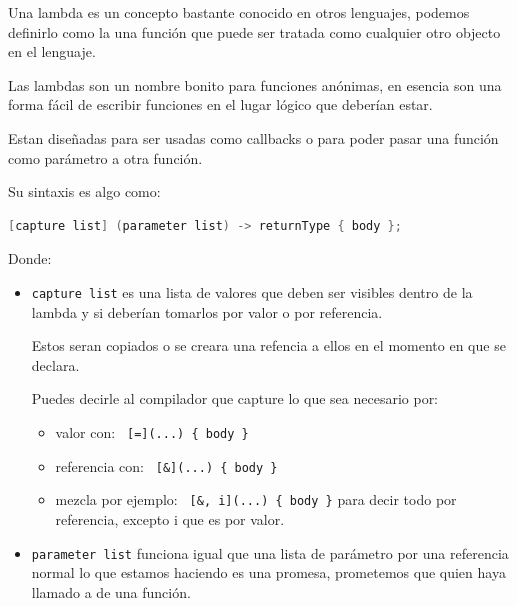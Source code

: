 \documentclass[12pt, fleqn]{report}                             %
\theoremstyle{break}                                            %
\newcommand{\textCode}[1]  { \texttt{#1} }                      %
\begin{document}
                Una lambda es un concepto bastante conocido en otros lenguajes, podemos definirlo como 
                la una función que puede ser tratada como cualquier otro objecto en el lenguaje.

                Las lambdas son un nombre bonito para funciones anónimas, en esencia son una forma fácil
                de escribir funciones en el lugar lógico que deberían estar.

                Estan diseñadas para ser usadas como callbacks o para poder pasar una función como parámetro
                a otra función.

                Su sintaxis es algo como:
                \begin{lstlisting}[language=C++, gobble=20]
                    [capture list] (parameter list) -> returnType { body };
                \end{lstlisting} 

                Donde:
                \begin{itemize}
                    \item \textCode{capture list} es una lista de valores que deben ser visibles dentro
                        de la lambda y si deberían tomarlos por valor o por referencia.

                        Estos seran copiados o se creara una refencia a ellos en el momento en que se
                        declara.

                        Puedes decirle al compilador que capture lo que sea necesario por:
                        \begin{itemize}
                            \item valor con: \textCode{ [=](...) \{ body \}}
                            \item referencia con: \textCode{ [\&](...) \{ body \}}
                            \item mezcla  por ejemplo: \textCode{ [\&, i](...) \{ body \}} 
                            \; para decir todo por referencia, excepto i que es por valor. 
                        \end{itemize}

                        
                    \item \textCode{parameter list} funciona igual que una lista de parámetro por una referencia normal
                    lo que estamos haciendo es una promesa, prometemos que quien haya llamado a  
                        de una función.
                \end{itemize}
\end{document}
